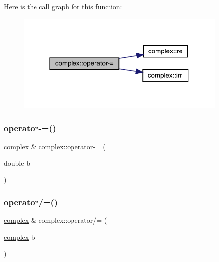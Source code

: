 Here is the call graph for this function\+:\nopagebreak
\begin{figure}[H]
\begin{center}
\leavevmode
\includegraphics[width=291pt]{classcomplex_af797416b6b4b45c2bb54958fcd076a0e_cgraph}
\end{center}
\end{figure}
\mbox{\label{classcomplex_a91a1788c52422330b8785ac3dc87972f}} 
\subsubsection{\texorpdfstring{operator-\/=()}{operator-=()}\hspace{0.1cm}{\footnotesize\ttfamily [2/2]}}
{\footnotesize\ttfamily \mbox{\hyperlink{classcomplex}{complex}} \& complex\+::operator-\/= (\begin{DoxyParamCaption}\item[{double}]{b }\end{DoxyParamCaption})}

\mbox{\label{classcomplex_a2f33210a2ac9f91ad3f1f94958c52ee9}} 
\subsubsection{\texorpdfstring{operator/=()}{operator/=()}\hspace{0.1cm}{\footnotesize\ttfamily [1/2]}}
{\footnotesize\ttfamily \mbox{\hyperlink{classcomplex}{complex}} \& complex\+::operator/= (\begin{DoxyParamCaption}\item[{\mbox{\hyperlink{classcomplex}{complex}}}]{b }\end{DoxyParamCaption})}

